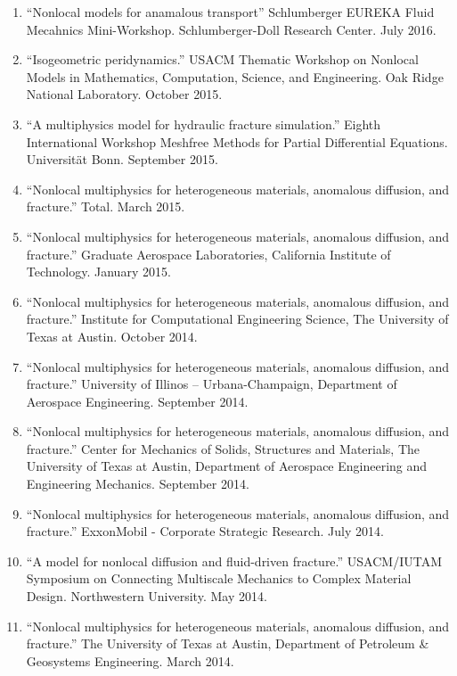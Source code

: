 \begin{etaremune}
\else
\begin{enumerate}
\fi
    \item ``Nonlocal models for anamalous transport'' Schlumberger EUREKA Fluid Mecahnics Mini-Workshop. Schlumberger-Doll Research Center. July 2016.
    \item ``Isogeometric peridynamics.'' USACM Thematic Workshop on Nonlocal Models in Mathematics, Computation, Science, and Engineering.  Oak Ridge National Laboratory. October 2015.
    \item ``A multiphysics model for hydraulic fracture simulation.''  Eighth International Workshop Meshfree Methods for Partial Differential Equations. Universit\"{a}t Bonn. September 2015.
    \item ``Nonlocal multiphysics for heterogeneous materials, anomalous diffusion, and fracture.'' Total. March 2015.
    \item ``Nonlocal multiphysics for heterogeneous materials, anomalous diffusion, and fracture.'' Graduate Aerospace Laboratories, California Institute of Technology. January 2015.
    \item ``Nonlocal multiphysics for heterogeneous materials, anomalous diffusion, and fracture.'' Institute for Computational Engineering Science, The University of Texas at Austin. October 2014.
    \item ``Nonlocal multiphysics for heterogeneous materials, anomalous diffusion, and fracture.'' University of Illinos -- Urbana-Champaign, Department of Aerospace Engineering. September 2014.
    \item ``Nonlocal multiphysics for heterogeneous materials, anomalous diffusion, and fracture.'' Center for Mechanics of Solids, Structures and Materials, The University of Texas at Austin, Department of Aerospace Engineering and Engineering Mechanics. September 2014.
    \item ``Nonlocal multiphysics for heterogeneous materials, anomalous diffusion, and fracture.'' ExxonMobil - Corporate Strategic Research. July 2014.
    \item ``A model for nonlocal diffusion and fluid-driven fracture.'' USACM/IUTAM Symposium on Connecting Multiscale Mechanics to Complex Material Design. Northwestern University. May 2014.
    \item ``Nonlocal multiphysics for heterogeneous materials, anomalous diffusion, and fracture.'' The University of Texas at Austin, Department of Petroleum \& Geosystems Engineering. March 2014.

\end{enumerate}
\end{etaremune}

